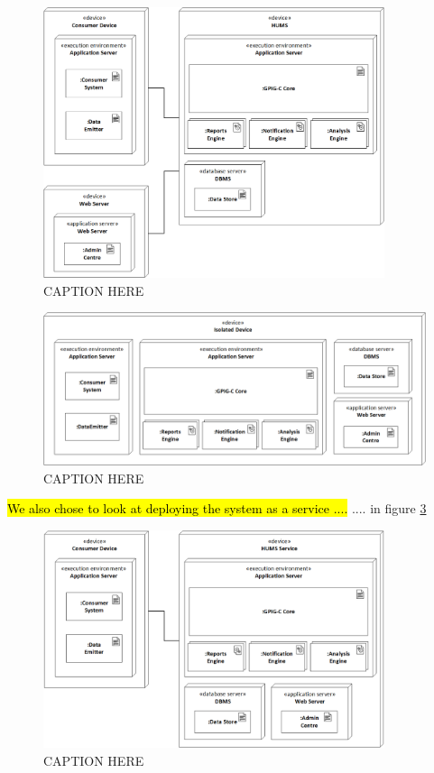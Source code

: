 \documentclass[10pt,a4paper]{article}
\begin{document}
\begin{figure}[!ht]
  \centering
  \includegraphics[width=10cm]{images/DeploymentDistributed.png}
  \caption{CAPTION HERE}
  \label{fig:DeploymentDistributed}
\end{figure}

\begin{figure}[!ht]
  \centering
  \includegraphics[width=12.5cm]{images/DeploymentIsolated.png}
  \caption{CAPTION HERE}
  \label{fig:DeploymentIsolated}
\end{figure}

\hl{We also chose to look at deploying the system as a service ....}
.... in figure \ref{fig:DeploymentService}

\begin{figure}[!ht]
  \centering
  \includegraphics[width=10cm]{images/DeploymentService.png}
  \caption{CAPTION HERE}
  \label{fig:DeploymentService}
\end{figure}
\end{document}
